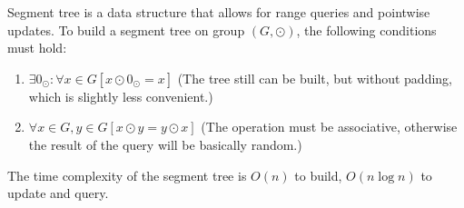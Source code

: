 Segment tree is a data structure that allows for range queries and pointwise updates. To build a segment tree on group $(G, \odot)$, the following conditions must hold:
\begin{enumerate}
  \item $\exists 0_{\odot}: \forall x \in G \left[ x \odot 0_{\odot} = x \right]$ (The tree still can be built, but without padding, which is slightly less convenient.)
  \item $\forall x \in G, y \in G \left[ x \odot y = y \odot x \right]$ (The operation must be associative, otherwise the result of the query will be basically random.)
\end{enumerate}

The time complexity of the segment tree is $O(n)$ to build, $O(n \log n)$ to update and query.


